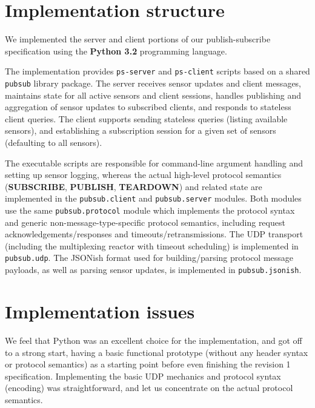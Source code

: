 \documentclass[a4paper]{article}
\begin{document}


\tableofcontents
\newpage

\section{Implementation structure}

We implemented the server and client portions of our publish-subscribe specification using the \textbf{Python 3.2} programming language.

The implementation provides \texttt{ps-server} and \texttt{ps-client} scripts based on a shared \texttt{pubsub} library package.
The server receives sensor updates and client messages, maintains state for all active sensors and client sessions, handles publishing and aggregation of sensor updates to subscribed clients, and responds to stateless client queries.
The client supports sending stateless queries (listing available sensors), and establishing a subscription session for a given set of sensors (defaulting to all sensors).

The executable scripts are responsible for command-line argument handling and setting up sensor logging, whereas the actual high-level protocol semantics (\textbf{SUBSCRIBE}, \textbf{PUBLISH}, \textbf{TEARDOWN}) and related state are implemented in the \texttt{pubsub.client} and \texttt{pubsub.server} modules.
Both modules use the same \texttt{pubsub.protocol} module which implements the protocol syntax and generic non-message-type-specific protocol semantics, including request acknowledgements/responses and timeouts/retransmissions.
The UDP transport (including the multiplexing reactor with timeout scheduling) is implemented in \texttt{pubsub.udp}.
The JSONish format used for building/parsing protocol message payloads, as well as parsing sensor updates, is implemented in \texttt{pubsub.jsonish}.

\section{Implementation issues}

We feel that Python was an excellent choice for the implementation, and got off to a strong start, having a basic functional prototype (without any header syntax or protocol semantics) as a starting point before even finishing the revision 1 specification.
Implementing the basic UDP mechanics and protocol syntax (encoding) was straightforward, and let us concentrate on the actual protocol semantics.
\end{document}
